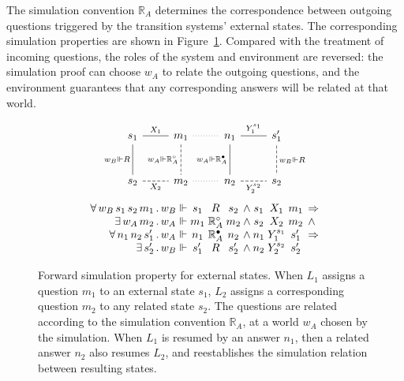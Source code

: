 \documentclass[11pt,oneside]{book}
\theoremstyle{definition}
\newcommand{\que}{\circ}         %
\newcommand{\ans}{\bullet}       %
\begin{document}
The simulation convention $\mathbb{R}_A$
determines the correspondence between
outgoing questions triggered by
the transition systems' external states.
The corresponding simulation properties
are shown in Figure~\ref{fig:fsim-ext}.
Compared with the treatment of incoming questions,
the roles of the system and environment are reversed:
the simulation proof can choose $w_A$
to relate the outgoing questions,
and the environment guarantees that any corresponding answers
will be related at that world.

\begin{figure} %
  \[
    \begin{array}{c}
      \begin{tikzcd}[row sep=large,baseline=-3pt]
        s_1 \ar[r, "X_1", dash] \ar[d, "w_B \Vdash R"', dash] &
        m_1 \ar[r, dotted, dash] \ar[d, "w_A \Vdash \mathbb{R}_A^\que"', dash, dashed] &
        n_1 \ar[r, "Y_1^{s_1}", dash] \ar[d, "w_A \Vdash \mathbb{R}_A^\ans"', dash] &
        s_1' \ar[d, "w_B \Vdash R", dash, dashed]
        \\
        s_2 \ar[r, "X_2"', dash, dashed] &
        m_2 \ar[r, dotted, dash] &
        n_2 \ar[r, "Y_2^{s_2}"', dash, dashed] &
        s_2
      \end{tikzcd}
      \vspace{1.5ex}
      \\
      \begin{array}{
          r @{\,.\,} l @{{} \Vdash {}} c@{}c@{}c @{\:\wedge\:}
                                    c@{}c@{}c @{\:\:} l}
        \forall \, w_B \, s_1 \, s_2 \, m_1 & w_B & s_1 & {}\mathrel{R}{} & s_2 &
                        s_1 & {}\mathrel{X_1}{} & m_1 & \Rightarrow \\
        \exists \, w_A \, m_2 & w_A & m_1 & {}\mathrel{\mathbb{R}_A^\que}{} & m_2 &
                        s_2 & {}\mathrel{X_2}{} & m_2 & \wedge \\
        \forall \, n_1 \, n_2 \, s_1' & w_A & n_1 & {}\mathrel{\mathbb{R}_A^\ans}{} & n_2 &
                        n_1 & {}\mathrel{Y_1^{s_1}}{} & s_1' & \Rightarrow \\
        \exists \, s_2' & w_B & s_1' & {}\mathrel{R}{} & s_2' &
                        n_2 & {}\mathrel{Y_2^{s_2}}{} & s_2' &
      \end{array}
    \end{array}
  \]
  \caption[Forward simulation properties (cont.)]%
   {Forward simulation property for external states.
    When $L_1$ assigns a question $m_1$ to an external state $s_1$,
    $L_2$ assigns a corresponding question $m_2$ to any related state $s_2$.
    The questions are related according to
    the simulation convention $\mathbb{R}_A$,
    at a world $w_A$ chosen by the simulation.
    When $L_1$ is resumed by an answer $n_1$,
    then a related answer $n_2$ also resumes $L_2$,
    and reestablishes the simulation relation
    between resulting states.}
  \label{fig:fsim-ext}
\end{figure}
\end{document}
